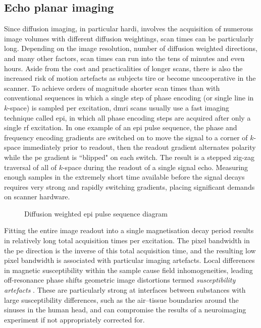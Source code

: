\subsection{Echo planar imaging}
\label{sec:epi}

Since diffusion imaging, in particular \gls{hardi}, involves the acquisition of numerous image volumes with different diffusion weightings, scan times can be particularly long.
Depending on the image resolution, number of diffusion weighted directions, and many other factors, scan times can run into the tens of minutes and even hours. 
Aside from the cost and practicalities of longer scans, there is also the increased risk of motion artefacts as subjects tire or become uncooperative in the scanner.
To achieve orders of magnitude shorter scan times than with conventional sequences in which a single step of phase encoding (or single line in $k$-space) is sampled per excitation, \gls{dmri} scans usually use a fast imaging technique called \gls{epi}, in which all phase encoding steps are acquired after only a single \gls{rf} excitation.
In one example of an \gls{epi} pulse sequence, the phase and frequency encoding gradients are switched on to move the signal to a corner of $k$-space immediately prior to readout, then the readout gradient alternates polarity while the \gls{pe} gradient is ``blipped" on each switch.\autocite{Wielopolski1998}
The result is a stepped zig-zag traversal of all of $k$-space during the readout of a single signal echo.
Measuring enough samples in the extremely short time available before the signal decays requires very strong and rapidly switching gradients, placing significant demands on scanner hardware.\autocite{Bowtell1998}

\begin{figure}
  
  \caption{Diffusion weighted \gls{epi} pulse sequence diagram}
  \label{fig:dwepi}
\end{figure}

Fitting the entire image readout into a single magnetisation decay period results in relatively long total acquisition times per excitation.
The pixel bandwidth in the \gls{pe} direction is the inverse of this total acquisition time, and the resulting low pixel bandwidth is associated with particular imaging artefacts.
Local differences in magnetic susceptibility within the sample cause field inhomogeneities, leading off-resonance phase shifts geometric image distortions termed \textit{susceptibility artefacts} \autocite{Fischer1998}.
These are particularly strong at interfaces between substances with large susceptibility differences, such as the air--tissue boundaries around the sinuses in the human head, and can compromise the results of a neuroimaging experiment if not appropriately corrected for.

